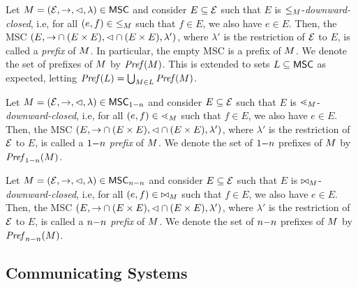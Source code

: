 \documentclass{article}
\begin{document}

Let $M = (\mathcal{E},\to,\lhd,\lambda) \in \mathsf{MSC}$ and consider
$E \subseteq \mathcal{E}$ such that $E$ is ${\le_M}$-\emph{downward-closed}, i.e,
for all $(e,f) \in {\le_M}$ such that $f \in E$, we also have $e \in E$.
Then, the MSC $(E,{\to} \cap (E \times E),{\lhd} \cap (E \times E),\lambda')$,
where $\lambda'$ is the restriction of $\mathcal{E}$ to $E$, is called a \emph{prefix}
of $M$. In particular, the empty MSC is a prefix of $M$.
We denote the set of prefixes of $M$ by $\mathit{Pref}(M)$.
This is extended to sets $L \subseteq \mathsf{MSC}$ as expected, letting
$\mathit{Pref}(L) = \bigcup_{M \in L} \mathit{Pref}(M)$.

\smallskip

Let $M = (\mathcal{E},\to,\lhd,\lambda) \in \mathsf{MSC}_{1\mathsf{-}n}$ and consider
$E \subseteq \mathcal{E}$ such that $E$ is ${\lessdot_M}$-\emph{downward-closed}, i.e,
for all $(e,f) \in {\lessdot_M}$ such that $f \in E$, we also have $e \in E$.
Then, the MSC $(E,{\to} \cap (E \times E),{\lhd} \cap (E \times E),\lambda')$,
where $\lambda'$ is the restriction of $\mathcal{E}$ to $E$, is called a \emph{$1\mathsf{-}n$ prefix} of $M$. We denote the set of $1\mathsf{-}n$ prefixes of $M$ by $\mathit{Pref}_{1\mathsf{-}n}(M)$.

\smallskip

Let $M = (\mathcal{E},\to,\lhd,\lambda) \in \mathsf{MSC}_{n\mathsf{-}n}$ and consider
$E \subseteq \mathcal{E}$ such that $E$ is ${\bowtie_M}$-\emph{downward-closed}, i.e,
for all $(e,f) \in {\bowtie_M}$ such that $f \in E$, we also have $e \in E$.
Then, the MSC $(E,{\to} \cap (E \times E),{\lhd} \cap (E \times E),\lambda')$,
where $\lambda'$ is the restriction of $\mathcal{E}$ to $E$, is called a \emph{$n\mathsf{-}n$ prefix} of $M$. We denote the set of $n\mathsf{-}n$ prefixes of $M$ by $\mathit{Pref}_{n\mathsf{-}n}(M)$.

\subsection{Communicating Systems}
\end{document}
